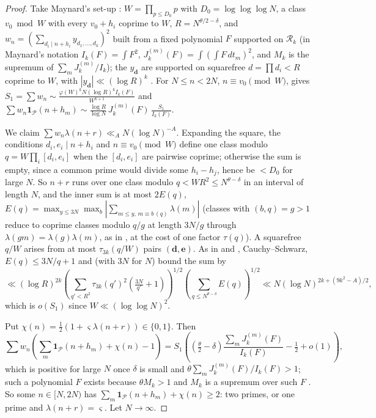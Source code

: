 \documentclass[11pt]{amsart}
\theoremstyle{definition}
\theoremstyle{remark}
\begin{document}
\begin{proof}
Take Maynard's set-up \cite[\S\S4--5]{May15}: $W=\prod_{p\le D_0}p$ with
$D_0=\log\log\log N$, a class $v_0\bmod W$ with every $v_0+h_i$ coprime to $W$,
$R=N^{\theta/2-\delta}$, and $w_n=\left(\sum_{d_i\mid n+h_i}y_{d_1,\dots,d_k}\right)^2$
built from a fixed polynomial $F$ supported on $\mathcal R_k$ (in Maynard's notation
$I_k(F)=\int F^2$, $J_k^{(m)}(F)=\int(\int F\,dt_m)^2$, and $M_k$ is the supremum of
$\sum_mJ_k^{(m)}/I_k$); the
$y_{\mathbf d}$ are supported on squarefree $d=\prod d_i<R$ coprime to $W$, with
$|y_{\mathbf d}|\ll(\log R)^k$ \cite[(5.9)]{May15}. For $N\le n<2N$,
$n\equiv v_0\pmod W$, \cite[Proposition~4.1]{May15} gives
$S_1=\sum w_n\sim\frac{\varphi(W)^kN(\log R)^kI_k(F)}{W^{k+1}}$ and
$\sum w_n\mathbf 1_{\mathcal P}(n+h_m)\sim\frac{\log R}{\log N}\,J_k^{(m)}(F)\,\frac{S_1}{I_k(F)}$.

We claim $\sum w_n\lambda(n+r)\ll_AN(\log N)^{-A}$. Expanding the square, the
conditions $d_i,e_i\mid n+h_i$ and $n\equiv v_0\pmod W$ define one class modulo
$q=W\prod_i[d_i,e_i]$ when the $[d_i,e_i]$ are pairwise coprime; otherwise the
sum is empty, since a common prime would divide some $h_i-h_j$, hence be
$<D_0$ for large $N$. So $n+r$ runs over one class modulo $q<WR^2\le
N^{\theta-\delta}$ in an interval of length $N$, and the inner sum is at most
$2E(q)$, $E(q)=\max_{y\le3N}\max_b\left|\sum_{m\le y,\,m\equiv b\,(q)}\lambda(m)\right|$
(classes with $(b,q)=g>1$ reduce to coprime classes modulo $q/g$ at length
$3N/g$ through $\lambda(gm)=\lambda(g)\lambda(m)$, as in \cite{Pi10}, at the cost of
one factor $\tau(q)$).
A squarefree $q/W$ arises from at most $\tau_{3k}(q/W)$ pairs
$(\mathbf d,\mathbf e)$. As in \cite[(5.18)--(5.20)]{May15} and
\cite[(3.14)--(3.16)]{Pi10}, Cauchy--Schwarz, $E(q)\le3N/q+1$ and
\cite[(2.2)]{Pi10} (with $3N$ for $N$) bound the sum by
\[
\ll(\log R)^{2k}\left(\sum_{q'<R^2}\tau_{3k}(q')^2\left(\tfrac{3N}{q'}+1\right)\right)^{1/2}
\left(\sum_{q\le N^{\theta-\delta}}E(q)\right)^{1/2}\ll N(\log N)^{2k+(9k^2-A)/2},
\]
which is $o(S_1)$ since $W\ll(\log\log N)^2$.

Put $\chi(n)=\frac12(1+\varsigma\lambda(n+r))\in\{0,1\}$. Then
\[
\sum w_n\left(\sum_m\mathbf 1_{\mathcal P}(n+h_m)+\chi(n)-1\right)
=S_1\left(\left(\tfrac\theta2-\delta\right)\frac{\sum_mJ_k^{(m)}(F)}{I_k(F)}-\tfrac12+o(1)\right),
\]
which is positive for large $N$ once $\delta$ is small and
$\theta\sum_mJ_k^{(m)}(F)/I_k(F)>1$; such a polynomial $F$ exists because
$\theta M_k>1$ and $M_k$ is a supremum over such $F$ \cite[Proposition~4.2]{May15}. So some $n\in[N,2N)$ has
$\sum_m\mathbf 1_{\mathcal P}(n+h_m)+\chi(n)\ge2$: two primes, or one prime and
$\lambda(n+r)=\varsigma$. Let $N\to\infty$.
\end{proof}
\end{document}
